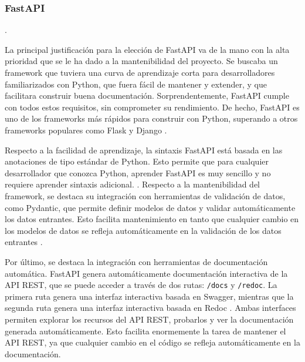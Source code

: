 \subsubsection{FastAPI}

 \cite{fastapi_docs}.

La principal justificación para la elección de \gls{FastAPI} va de la mano con la alta prioridad que se le ha dado a la mantenibilidad del proyecto. Se buscaba un framework que tuviera una curva de aprendizaje corta para desarrolladores familiarizados con \gls{Python}, que fuera fácil de mantener y extender, y que facilitara construir buena documentación. Sorprendentemente, \gls{FastAPI} cumple con todos estos requisitos, sin comprometer su rendimiento. De hecho, \gls{FastAPI} es uno de los frameworks más rápidos para construir  con \gls{Python}, superando a otros frameworks populares como Flask y Django \cite{fastapi_benchmarks}.

Respecto a la facilidad de aprendizaje, la sintaxis \gls{FastAPI} está basada en las anotaciones de tipo estándar de \gls{Python}. Esto permite que para cualquier desarrollador que conozca \gls{Python}, aprender \gls{FastAPI} es muy sencillo y no requiere aprender sintaxis adicional. \cite{fastapi_features}. Respecto a la mantenibilidad del framework, se destaca su integración con herramientas de validación de datos, como \gls{Pydantic}, que permite definir modelos de datos y validar automáticamente los datos entrantes. Esto facilita mantenimiento en tanto que cualquier cambio en los modelos de datos se refleja automáticamente en la validación de los datos entrantes \cite{fastapi_features}.

Por último, se destaca la integración con herramientas de documentación automática. \gls{FastAPI} genera automáticamente documentación interactiva de la \gls{API REST}, que se puede acceder a través de dos rutas: \verb|/docs| y \verb|/redoc|. La primera ruta genera una interfaz interactiva basada en \gls{Swagger}, mientras que la segunda ruta genera una interfaz interactiva basada en \gls{Redoc} \cite{fastapi_features}. Ambas interfaces permiten explorar los recursos del \gls{API REST}, probarlos y ver la documentación generada automáticamente. Esto facilita enormemente la tarea de mantener el \gls{API REST}, ya que cualquier cambio en el código se refleja automáticamente en la documentación.

